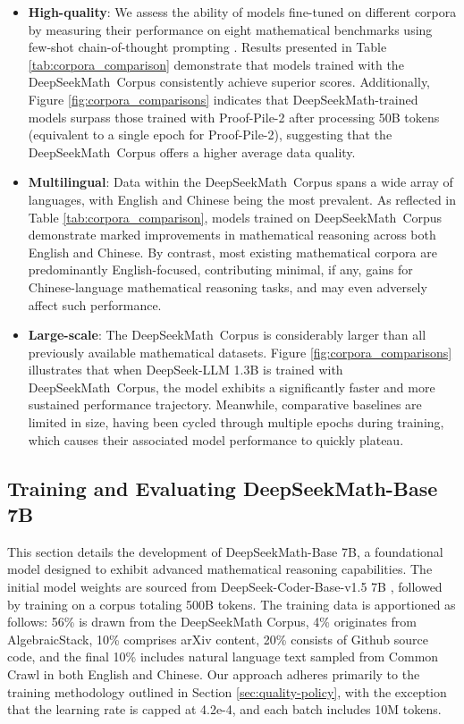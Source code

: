 \begin{itemize}[topsep=0pt]
\begin{itemize}[topsep=0pt]
    \item \textbf{High-quality}:
    We assess the ability of models fine-tuned on different corpora by measuring their performance on eight mathematical benchmarks using few-shot chain-of-thought prompting \cite{cot}. Results presented in Table \ref{tab:corpora_comparison} demonstrate that models trained with the DeepSeekMath~Corpus consistently achieve superior scores. Additionally, Figure \ref{fig:corpora_comparisons} indicates that DeepSeekMath-trained models surpass those trained with Proof-Pile-2 after processing 50B tokens (equivalent to a single epoch for Proof-Pile-2), suggesting that the DeepSeekMath~Corpus offers a higher average data quality.
    \item \textbf{Multilingual}:
    Data within the DeepSeekMath~Corpus spans a wide array of languages, with English and Chinese being the most prevalent. As reflected in Table \ref{tab:corpora_comparison}, models trained on DeepSeekMath~Corpus demonstrate marked improvements in mathematical reasoning across both English and Chinese. By contrast, most existing mathematical corpora are predominantly English-focused, contributing minimal, if any, gains for Chinese-language mathematical reasoning tasks, and may even adversely affect such performance.
    \item \textbf{Large-scale}:
    The DeepSeekMath~Corpus is considerably larger than all previously available mathematical datasets. Figure \ref{fig:corpora_comparisons} illustrates that when DeepSeek-LLM 1.3B is trained with DeepSeekMath~Corpus, the model exhibits a significantly faster and more sustained performance trajectory. Meanwhile, comparative baselines are limited in size, having been cycled through multiple epochs during training, which causes their associated model performance to quickly plateau.
\end{itemize}

\subsection{Training and Evaluating DeepSeekMath-Base 7B}

This section details the development of DeepSeekMath-Base 7B, a foundational model designed to exhibit advanced mathematical reasoning capabilities. The initial model weights are sourced from DeepSeek-Coder-Base-v1.5 7B \citep{deepseek-coder}, followed by training on a corpus totaling 500B tokens. The training data is apportioned as follows: 56\% is drawn from the DeepSeekMath Corpus, 4\% originates from AlgebraicStack, 10\% comprises arXiv content, 20\% consists of Github source code, and the final 10\% includes natural language text sampled from Common Crawl in both English and Chinese. Our approach adheres primarily to the training methodology outlined in Section \ref{sec:quality-policy}, with the exception that the learning rate is capped at 4.2e-4, and each batch includes 10M tokens.


\end{itemize}
